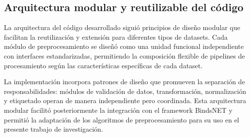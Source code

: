 \subsection{Arquitectura modular y reutilizable del código}

La arquitectura del código desarrollado siguió principios de diseño modular que facilitan la reutilización y extensión para diferentes tipos de datasets. Cada módulo de preprocesamiento se diseñó como una unidad funcional independiente con interfaces estandarizadas, permitiendo la composición flexible de pipelines de procesamiento según las características específicas de cada dataset. 

La implementación incorpora patrones de diseño que promueven la separación de responsabilidades: módulos de validación de datos, transformación, normalización y etiquetado operan de manera independiente pero coordinada. Esta arquitectura modular facilitó posteriormente la integración con el framework BindsNET y permitió la adaptación de los algoritmos de preprocesamiento para su uso en el presente trabajo de investigación.

